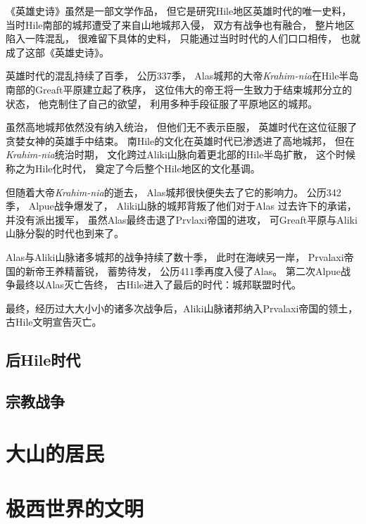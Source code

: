 \documentclass[UTF8,12pt,draft]{ctexbook}
\begin{document}
        《英雄史诗》虽然是一部文学作品，
        但它是研究Hile地区英雄时代的唯一史料，
        当时Hile南部的城邦遭受了来自山地城邦入侵，
        双方有战争也有融合，
        整片地区陷入一阵混乱，
        很难留下具体的史料，
        只能通过当时时代的人们口口相传，
        也就成了这部《英雄史诗》。

        英雄时代的混乱持续了百季，
        公历337季，
        Alas城邦的大帝\emph{Krahim-nia}在Hile半岛南部的Greaft平原建立起了秩序，
        这位伟大的帝王将一生致力于结束城邦分立的状态，
        他克制住了自己的欲望，
        利用多种手段征服了平原地区的城邦。

        虽然高地城邦依然没有纳入统治，
        但他们无不表示臣服，
        英雄时代在这位征服了贪婪女神的英雄手中结束。
        南Hile的文化在英雄时代已渗透进了高地城邦，
        但在\emph{Krahim-nia}统治时期，
        文化跨过Aliki山脉向着更北部的Hile半岛扩散，
        这个时候称之为Hile化时代，
        奠定了今后整个Hile地区的文化基调。


        但随着大帝\emph{Krahim-nia}的逝去，
        Alas城邦很快便失去了它的影响力。
        公历342季，
        Alpue战争爆发了，
        Aliki山脉的城邦背叛了他们对于Alas
        过去许下的承诺，
        并没有派出援军，
        虽然Alas最终击退了Prvlaxi帝国的进攻，
        可Greaft平原与Aliki山脉分裂的时代也到来了。
        
        Alas与Aliki山脉诸多城邦的战争持续了数十季，
        此时在海峡另一岸，
        Prvalaxi帝国的新帝王养精蓄锐，
        蓄势待发，
        公历411季再度入侵了Alas。
        第二次Alpue战争最终以Alas灭亡告终，
        古Hile进入了最后的时代：城邦联盟时代。

        最终，经历过大大小小的诸多次战争后，Aliki山脉诸邦纳入Prvalaxi帝国的领土，
        古Hile文明宣告灭亡。
        \section{后Hile时代}

        \section{宗教战争}


    \chapter{大山的居民}
    \chapter{极西世界的文明}
\end{document}
